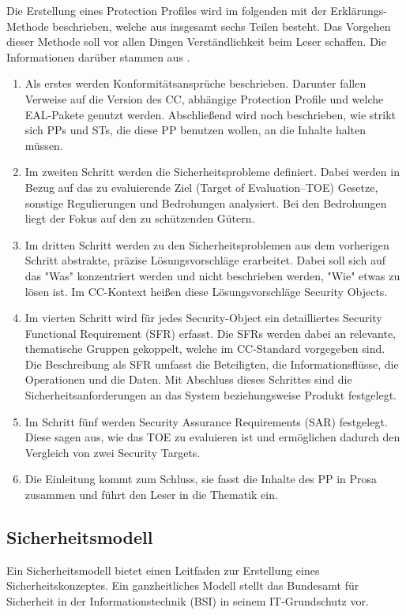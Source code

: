 \documentclass[11pt,a4paper]{report}
\begin{document}
Die Erstellung eines Protection Profiles wird im folgenden mit der Erklärungs-Methode beschrieben, welche aus insgesamt sechs Teilen besteht. Das Vorgehen dieser Methode soll vor allen Dingen Verständlichkeit beim Leser schaffen. Die Informationen darüber stammen aus \cite{bsi_ccguide}.
\begin{enumerate}
\item Als erstes werden Konformitätsansprüche beschrieben. Darunter fallen Verweise auf die Version des CC, abhängige Protection Profile und welche EAL-Pakete genutzt werden. Abschließend wird noch beschrieben, wie strikt sich PPs und STs, die diese PP benutzen wollen, an die Inhalte halten müssen.
\item Im zweiten Schritt werden die Sicherheitsprobleme definiert. Dabei werden in Bezug auf das zu evaluierende Ziel (Target of Evaluation--TOE) Gesetze, sonstige Regulierungen und Bedrohungen analysiert. Bei den Bedrohungen liegt der Fokus auf den zu schützenden Gütern.
\item Im dritten Schritt werden zu den Sicherheitsproblemen aus dem vorherigen Schritt abstrakte, präzise Lösungsvorschläge erarbeitet. Dabei soll sich auf das "Was" konzentriert werden und nicht beschrieben werden, "Wie" etwas zu lösen ist. Im CC-Kontext heißen diese Lösungsvorschläge Security Objects. 
\item Im vierten Schritt wird für jedes Security-Object ein detailliertes Security Functional Requirement (SFR) erfasst. Die SFRs werden dabei an relevante, thematische Gruppen gekoppelt, welche im CC-Standard vorgegeben sind. Die Beschreibung als SFR umfasst die Beteiligten, die Informationsflüsse, die Operationen und die Daten. Mit Abschluss dieses Schrittes sind die Sicherheitsanforderungen an das System beziehungsweise Produkt festgelegt. 
\item Im Schritt fünf werden Security Assurance Requirements (SAR) festgelegt. Diese sagen aus, wie das TOE zu evaluieren ist und ermöglichen dadurch den Vergleich von zwei Security Targets.
\item Die Einleitung kommt zum Schluss, sie fasst die Inhalte des PP in Prosa zusammen und führt den Leser in die Thematik ein.
\end{enumerate}

\subsection{Sicherheitsmodell}

Ein Sicherheitsmodell bietet einen Leitfaden zur Erstellung eines Sicherheitskonzeptes. Ein ganzheitliches Modell stellt das Bundesamt für Sicherheit in der Informationstechnik (BSI) in seinem IT-Grund\-schutz vor.
\end{document}
